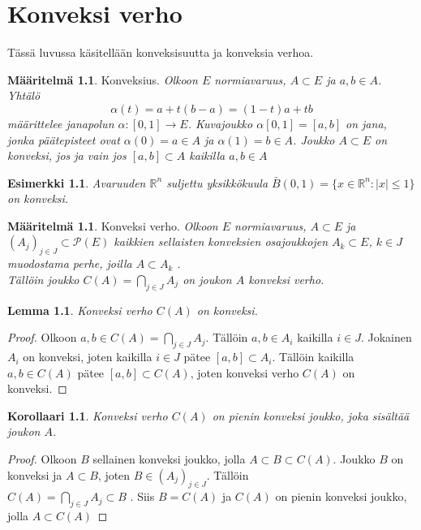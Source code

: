 \documentclass[12pt,a4paper,leqno]{report}
\newcommand{\R}{\mathbb{R}}
\theoremstyle{plain}
\newtheorem{lem}[equation]{Lemma}
\newtheorem{kor}[equation]{Korollaari}
\theoremstyle{definition}
\newtheorem{maar}[equation]{Määritelmä}
\newtheorem{esim}[equation]{Esimerkki}
\theoremstyle{remark}
\begin{document}
\chapter{Konveksi verho}\label{konverho}
Tässä luvussa käsitellään konveksisuutta ja konveksia verhoa.
\begin{maar}%
Konveksius. \emph{Olkoon $E$ normiavaruus, $A\subset E$ ja $a,b\in A$. Yhtälö 
$$\alpha (t)=a+t(b-a)=(1-t)a+tb$$ 
määrittelee janapolun $\alpha \colon [0,1]\rightarrow E$. Kuvajoukko $\alpha [0,1] = [a,b]$ on jana, jonka päätepisteet ovat $\alpha (0)=a\in A$ ja $\alpha (1)=b\in A$. 
Joukko $A\subset E$ on konveksi, jos ja vain jos $[a,b]\subset A$ kaikilla $a,b\in A$ 
}
\end{maar}
\begin{esim}
\emph{
Avaruuden $\R ^n$ suljettu yksikkökuula $ \bar B(0,1)= \{x\in \R ^n \colon |x|\leq 1\}$ on konveksi.
}
\end{esim}
\begin{maar}Konveksi verho. \emph{Olkoon $E$ normiavaruus, $A\subset E$ ja $(A_j)_{j\in J}\subset \mathcal{P}(E)$ 
kaikkien sellaisten konveksien osajoukkojen $A_k\subset E$, $k\in J$ muodostama perhe, joilla %
$A\subset A_k$%
.\\ Tällöin joukko $C(A)=\bigcap_{j\in J} A_j$ on joukon $A$ konveksi verho. }
\end{maar}
\begin{lem} \emph{Konveksi verho $C(A)$ on konveksi}.\end{lem} 
\begin{proof} Olkoon $a,b\in C(A)=\bigcap_{j\in J} A_j$. 
Tällöin $a,b\in A_i$ kaikilla $i\in J$. %
Jokainen $A_i$ on konveksi, joten kaikilla $i\in J$ pätee $[a,b]\subset A_i$.
Tällöin kaikilla $a,b\in C(A)$ pätee $[a,b] \subset C(A)$, joten konveksi verho $C(A)$ on konveksi.
\end{proof}
\begin{kor}\emph{Konveksi verho $C(A)$ on pienin konveksi joukko, joka sisältää joukon $A$.}
\end{kor}
\begin{proof} Olkoon $B$ sellainen konveksi joukko, jolla $A\subset B\subset C(A)$. 
Joukko $B$ on konveksi ja $A\subset B$, joten $B\in (A_j)_{j\in J}$. 
Tällöin\\ $C(A)=\bigcap_{j\in J} A_j\subset B$%
. Siis $B= C(A)$ ja $C(A)$ on pienin konveksi joukko, jolla $A\subset C(A)$
\end{proof}
\end{document}
